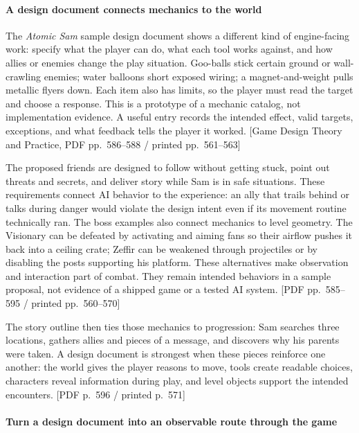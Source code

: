 \paragraph{A design document connects mechanics to the world}\label{05-engine-i-ch009-a-design-document-connects-mechanics-to-the-world}

\hypertarget{05-engine-i-ch009-a-design-document-connects-mechanics-to-the-world}{}

The \emph{Atomic Sam} sample design document shows a different kind of engine-facing work: specify what the player can do, what each tool works against, and how allies or enemies change the play situation. Goo-balls stick certain ground or wall-crawling enemies; water balloons short exposed wiring; a magnet-and-weight pulls metallic flyers down. Each item also has limits, so the player must read the target and choose a response. This is a prototype of a mechanic catalog, not implementation evidence. A useful entry records the intended effect, valid targets, exceptions, and what feedback tells the player it worked. {[}Game Design Theory and Practice, PDF pp.~586--588 / printed pp.~561--563{]}

The proposed friends are designed to follow without getting stuck, point out threats and secrets, and deliver story while Sam is in safe situations. These requirements connect AI behavior to the experience: an ally that trails behind or talks during danger would violate the design intent even if its movement routine technically ran. The boss examples also connect mechanics to level geometry. The Visionary can be defeated by activating and aiming fans so their airflow pushes it back into a ceiling crate; Zeffir can be weakened through projectiles or by disabling the posts supporting his platform. These alternatives make observation and interaction part of combat. They remain intended behaviors in a sample proposal, not evidence of a shipped game or a tested AI system. {[}PDF pp.~585--595 / printed pp.~560--570{]}

The story outline then ties those mechanics to progression: Sam searches three locations, gathers allies and pieces of a message, and discovers why his parents were taken. A design document is strongest when these pieces reinforce one another: the world gives the player reasons to move, tools create readable choices, characters reveal information during play, and level objects support the intended encounters. {[}PDF p.~596 / printed p.~571{]}

\paragraph{Turn a design document into an observable route through the game}\label{05-engine-i-ch009-turn-a-design-document-into-an-observable-route-through-the-game}

